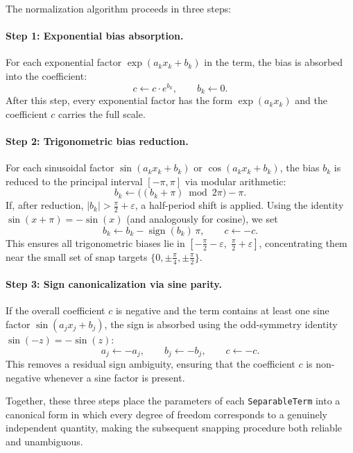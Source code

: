 The normalization algorithm proceeds in three steps:

\paragraph{Step 1: Exponential bias absorption.}
For each exponential factor $\exp(a_k x_k + b_k)$ in the term, the
bias is absorbed into the coefficient:
\begin{equation}
  c \leftarrow c \cdot e^{b_k}, \qquad b_k \leftarrow 0.
\end{equation}
After this step, every exponential factor has the form $\exp(a_k x_k)$
and the coefficient $c$ carries the full scale.

\paragraph{Step 2: Trigonometric bias reduction.}
For each sinusoidal factor $\sin(a_k x_k + b_k)$ or
$\cos(a_k x_k + b_k)$, the bias $b_k$ is reduced to the principal
interval $[-\pi, \pi]$ via modular arithmetic:
\begin{equation}
  b_k \leftarrow \bigl((b_k + \pi) \bmod 2\pi\bigr) - \pi.
\end{equation}
If, after reduction, $|b_k| > \tfrac{\pi}{2} + \varepsilon$, a
half-period shift is applied. Using the identity
$\sin(x + \pi) = -\sin(x)$ (and analogously for cosine), we set
\begin{equation}
  b_k \leftarrow b_k - \operatorname{sign}(b_k)\,\pi, \qquad c \leftarrow -c.
\end{equation}
This ensures all trigonometric biases lie in $[-\tfrac{\pi}{2} - \varepsilon,\; \tfrac{\pi}{2} + \varepsilon]$, concentrating them near the
small set of snap targets $\{0, \pm\tfrac{\pi}{4}, \pm\tfrac{\pi}{2}\}$.

\paragraph{Step 3: Sign canonicalization via sine parity.}
If the overall coefficient $c$ is negative and the term contains at
least one sine factor $\sin(a_j x_j + b_j)$, the sign is absorbed
using the odd-symmetry identity $\sin(-z) = -\sin(z)$:
\begin{equation}
  a_j \leftarrow -a_j, \qquad b_j \leftarrow -b_j, \qquad c \leftarrow -c.
\end{equation}
This removes a residual sign ambiguity, ensuring that the coefficient
$c$ is non-negative whenever a sine factor is present.

Together, these three steps place the parameters of each
\texttt{SeparableTerm} into a canonical form in which every degree of
freedom corresponds to a genuinely independent quantity, making the
subsequent snapping procedure both reliable and unambiguous.
